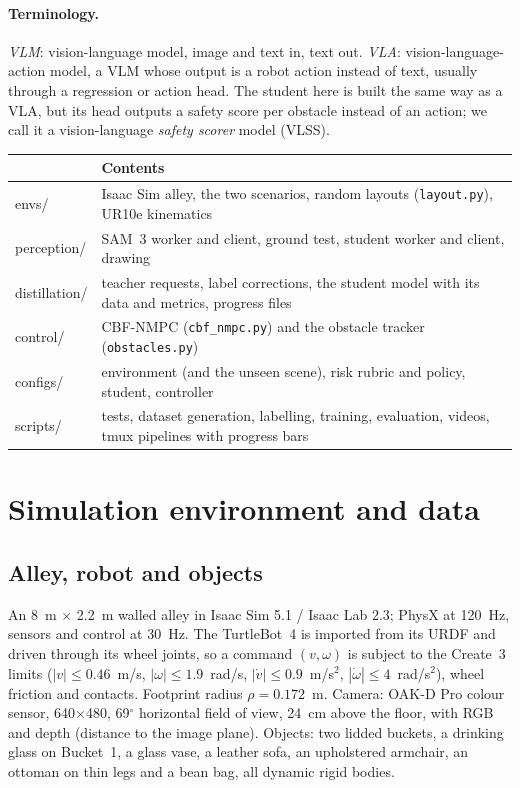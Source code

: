 \documentclass[10pt,a4paper]{article}
\newcommand{\code}[1]{\texttt{#1}}
\begin{document}
\paragraph{Terminology.} \emph{VLM}: vision-language model, image and text in, text out. \emph{VLA}: vision-language-action
model, a VLM whose output is a robot action instead of text, usually through a regression or action head. The student here is
built the same way as a VLA, but its head outputs a safety score per obstacle instead of an action; we call it a
vision-language \emph{safety scorer} model (VLSS).

\begin{center}\footnotesize
\begin{tabularx}{\textwidth}{>{\ttfamily}l X}
\toprule
\multicolumn{1}{l}{Folder} & Contents \\
\midrule
envs/ & Isaac Sim alley, the two scenarios, random layouts (\code{layout.py}), UR10e kinematics \\
perception/ & SAM~3 worker and client, ground test, student worker and client, drawing \\
distillation/ & teacher requests, label corrections, the student model with its data and metrics, progress files \\
control/ & CBF-NMPC (\code{cbf\_nmpc.py}) and the obstacle tracker (\code{obstacles.py}) \\
configs/ & environment (and the unseen scene), risk rubric and policy, student, controller \\
scripts/ & tests, dataset generation, labelling, training, evaluation, videos, tmux pipelines with progress bars \\
\bottomrule
\end{tabularx}\end{center}

\section{Simulation environment and data}

\subsection{Alley, robot and objects}
An 8~m $\times$ 2.2~m walled alley in Isaac Sim 5.1 / Isaac Lab 2.3; PhysX at 120~Hz, sensors and control at 30~Hz. The
TurtleBot~4 is imported from its URDF and driven through its wheel joints, so a command $(v,\omega)$ is subject to the Create~3
limits ($|v|\leq0.46$~m/s, $|\omega|\leq1.9$~rad/s, $|\dot v|\leq0.9$~m/s$^2$, $|\dot\omega|\leq4$~rad/s$^2$), wheel friction and
contacts. Footprint radius $\rho=0.172$~m. Camera: OAK-D Pro colour sensor, 640$\times$480, 69$^\circ$ horizontal field of view,
24~cm above the floor, with RGB and depth (distance to the image plane). Objects: two lidded buckets, a drinking glass on
Bucket~1, a glass vase, a leather sofa, an upholstered armchair, an ottoman on thin legs and a bean bag, all dynamic rigid bodies.
\end{document}
